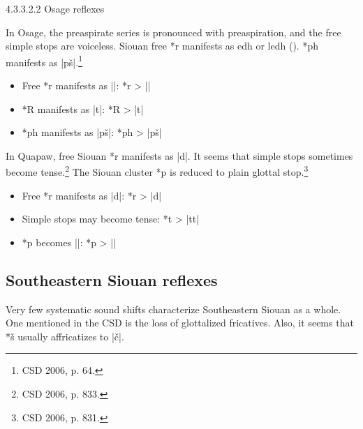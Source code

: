 \documentclass[output=paper]{LSP/langsci}
\begin{document}
4.3.3.2.2  Osage reflexes
\vspace{1em}

In Osage, the preaspirate series is pronounced with preaspiration, and the free simple stops are voiceless.  Siouan free *r manifests as edh or ledh ().  *ph manifests as |p\v{s}|.\footnote{ CSD 2006, p. 64.} 

\begin{itemize}
\item Free *r manifests as ||: \hspace{1em} *r	>	||
\item *R manifests as |t|: \hspace{3em} *R	>	|t|
\item *ph manifests as |p\v{s}|: \hspace{2em} *ph	>	|p\v{s}|
\end{itemize}


In Quapaw, free Siouan *r manifests as |d|.  It seems that simple stops sometimes become tense.\footnote{CSD 2006, p. 833.} The Siouan cluster *p\textsuperscript{} is reduced to plain glottal stop.\footnote{CSD 2006, p. 831.} 

\begin{itemize}
\item Free *r manifests as |d|: \hspace{5em} *r	>	|d|
\item Simple stops may become tense:	\hspace{1em} *t	>	|tt|
\item *p\textsuperscript{} becomes |\textsuperscript{}|: \hspace{8em} *p\textsuperscript{}	>	|\textsuperscript{}|
\end{itemize}

\subsection{Southeastern Siouan reflexes}

Very few systematic sound shifts characterize Southeastern Siouan as a whole.  One mentioned in the CSD is the loss of glottalized fricatives.  Also, it seems that *\v{s} usually affricatizes to |\v{c}|.
\end{document}
